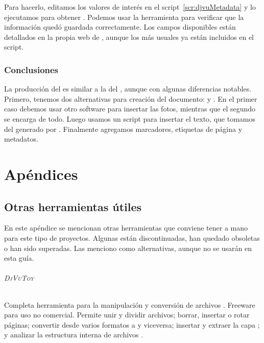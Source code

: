 \documentclass[%
	a5paper,
	10pt,
	twoside,
	openright,
	final,
]{memoir}
\begin{document}
{	Para hacerlo, editamos los valores de interés en el script~\ref{scr:djvuMetadata} y lo ejecutamos para obtener . Podemos usar la herramienta \exiftool para verificar que la información quedó guardada correctamente. Los campos disponibles están detallados en la propia web de \exiftool \cite{DjVuTags}, aunque los más usuales ya están incluidos en el script.


	\section{Conclusiones} La producción del \djvu es similar a la del \pdf, aunque con algunas diferencias notables. Primero, tenemos dos alternativas para creación del documento: \djvusmall y \djvusmallmod. En el primer caso debemos usar otro software para insertar las fotos, mientras que el segundo se encarga de todo. Luego usamos un script para insertar el texto, que tomamos del \djvu generado por \abbyy. Finalmente agregamos marcadores, etiquetas de página y metadatos.

	\part{Apéndices}\appendix

	\chapter{Otras herramientas útiles} En este apéndice se mencionan otras herramientas que conviene tener a mano para este tipo de proyectos. Algunas están discontinuadas, han quedado obsoletas o han sido superadas. Las menciono como alternativas, aunque no se usarán en esta guía.

	\paragraph{\textsc{DjVuToy}} Completa herramienta para la manipulación y conversión de archivos \djvu. Freeware para uso no comercial. Permite unir y dividir archivos; borrar, insertar o rotar páginas; convertir desde varios formatos a \djvu y viceversa; insertar y extraer la capa \ocr; y analizar la estructura interna de archivos \djvu \cite{DjVuToy}.
}
\end{document}
